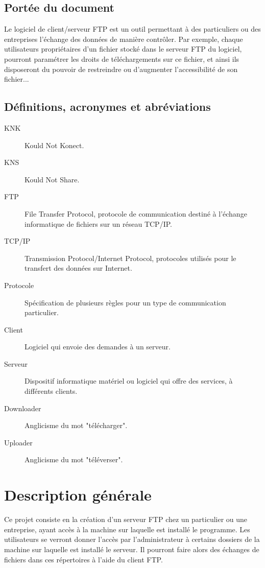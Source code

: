 \documentclass[10pt,a4paper]{report}
\begin{document}
\subsection{Portée du document}
Le logiciel de client/serveur FTP est un outil permettant à des particuliers ou des entreprises l'échange des données de manière contrôler. Par exemple, chaque utilisateurs propriétaires d'un fichier stocké dans le serveur FTP du logiciel, pourront paramétrer les droits de téléchargements sur ce fichier, et ainsi ils disposeront du pouvoir de restreindre ou d'augmenter l'accessibilité de son fichier...


\subsection{Définitions, acronymes et abréviations}
\begin{description}
\item[KNK] Kould Not Konect.
\item[KNS] Kould Not Share.
\item[FTP] File Transfer Protocol, protocole de communication destiné à l'échange informatique de fichiers sur un réseau TCP/IP.
\item[TCP/IP] Transmission Protocol/Internet Protocol, protocoles utilisés pour le transfert des données sur Internet.
\item[Protocole] Spécification de plusieurs règles pour un type de communication particulier.
\item[Client] Logiciel qui envoie des demandes à un serveur.
\item[Serveur] Dispositif informatique matériel ou logiciel qui offre des services, à différents clients.
\item[Downloader] Anglicisme du mot "télécharger".
\item[Uploader] Anglicisme du mot "téléverser".
\end{description}


\section{Description générale}

Ce projet consiste en la création d'un serveur FTP chez un particulier ou une entreprise, ayant accès à la machine sur laquelle est installé le programme. Les utilisateurs se verront donner l'accès par l'administrateur à certains dossiers de la machine sur laquelle est installé le serveur. Il pourront faire alors des échanges de fichiers dans ces répertoires à l'aide du client FTP.\\
\end{document}
